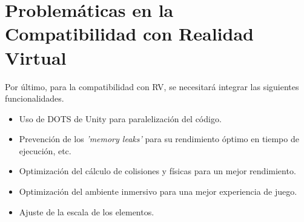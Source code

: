 \section{Problemáticas en la Compatibilidad con Realidad Virtual}

Por último, para la compatibilidad con RV, se necesitará integrar las siguientes funcionalidades.
\begin{itemize}
    \item Uso de DOTS de Unity para paralelización del código.
    \item Prevención de los \textit{'memory leaks'} para su rendimiento óptimo en tiempo de ejecución, etc.
    \item Optimización del cálculo de colisiones y físicas para un mejor rendimiento.
    \item Optimización del ambiente inmersivo para una mejor experiencia de juego.
    \item Ajuste de la escala de los elementos.
\end{itemize}

